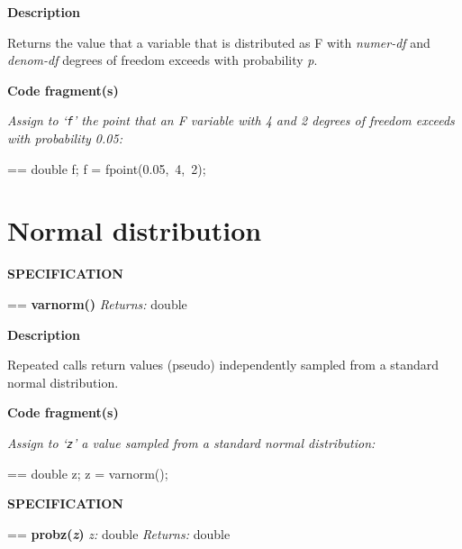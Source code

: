 \documentclass{book}
\makeatletter
\newcommand\Texinfocommandstyletextvar[1]{{\normalfont{}\textsl{#1}}}%
\newenvironment{Texinfopreformatted}{%
  \par\GNUTobeylines\obeyspaces\frenchspacing\parskip=\z@\parindent=\z@}{}
{\catcode`\^^M=13 \gdef\GNUTobeylines{\catcode`\^^M=13 \def^^M{\null\par}}}
\newenvironment{Texinfoindented}{\begin{list}{}{}\item\relax}{\end{list}}
\renewcommand{\_}{\Texinfounderscore\discretionary{}{}{}}
\makeatother
\begin{document}
\noindent{}\textbf{Description}

Returns the value that a variable that is distributed as F with
\Texinfocommandstyletextvar{numer-df} and \Texinfocommandstyletextvar{denom-df} degrees of freedom exceeds with probability \Texinfocommandstyletextvar{p}.

\noindent{}\textbf{Code fragment(s)}

\emph{Assign to `\texttt{f}' the point
that an F variable with 4 and 2 degrees of freedom
exceeds with probability 0.05:}
\begin{Texinfoindented}
\begin{Texinfopreformatted}%
\ttfamily double f;
f = fpoint(0.05,\ 4,\ 2);
\end{Texinfopreformatted}
\end{Texinfoindented}

\section{{Normal distribution}}
\label{anchor:Normal-distribution}%
%
%

\noindent{}\textbf{SPECIFICATION}
\begin{Texinfoindented}
\begin{Texinfopreformatted}%
\textbf{varnorm()}
\Texinfocommandstyletextvar{Returns:} double
\end{Texinfopreformatted}
\end{Texinfoindented}

\noindent{}\textbf{Description}

Repeated calls return values (pseudo) independently
sampled from a standard normal distribution.

\noindent{}\textbf{Code fragment(s)}

\emph{Assign to `\texttt{z}' a value sampled from a standard normal distribution:}
\begin{Texinfoindented}
\begin{Texinfopreformatted}%
\ttfamily double z;
z = varnorm();
\end{Texinfopreformatted}
\end{Texinfoindented}

\noindent{}\textbf{SPECIFICATION}
\begin{Texinfoindented}
\begin{Texinfopreformatted}%
\textbf{probz(\Texinfocommandstyletextvar{z})}
\Texinfocommandstyletextvar{z:} double
\Texinfocommandstyletextvar{Returns:} double
\end{Texinfopreformatted}
\end{Texinfoindented}
\end{document}

